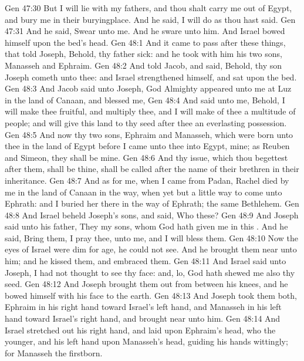 \vs Gen 47:30 But I will lie with my fathers, and thou shalt carry me out of Egypt, and bury me in their buryingplace. And he said, I will do as thou hast said.
\vs Gen 47:31 And he said, Swear unto me. And he sware unto him. And Israel bowed himself upon the bed's head.
\vs Gen 48:1 And it came to pass after these things, that  told Joseph, Behold, thy father  sick: and he took with him his two sons, Manasseh and Ephraim.
\vs Gen 48:2 And  told Jacob, and said, Behold, thy son Joseph cometh unto thee: and Israel strengthened himself, and sat upon the bed.
\vs Gen 48:3 And Jacob said unto Joseph, God Almighty appeared unto me at Luz in the land of Canaan, and blessed me,
\vs Gen 48:4 And said unto me, Behold, I will make thee fruitful, and multiply thee, and I will make of thee a multitude of people; and will give this land to thy seed after thee  an everlasting possession.
\vs Gen 48:5 And now thy two sons, Ephraim and Manasseh, which were born unto thee in the land of Egypt before I came unto thee into Egypt,  mine; as Reuben and Simeon, they shall be mine.
\vs Gen 48:6 And thy issue, which thou begettest after them, shall be thine,  shall be called after the name of their brethren in their inheritance.
\vs Gen 48:7 And as for me, when I came from Padan, Rachel died by me in the land of Canaan in the way, when yet  but a little way to come unto Ephrath: and I buried her there in the way of Ephrath; the same  Bethlehem.
\vs Gen 48:8 And Israel beheld Joseph's sons, and said, Who  these?
\vs Gen 48:9 And Joseph said unto his father, They  my sons, whom God hath given me in this . And he said, Bring them, I pray thee, unto me, and I will bless them.
\vs Gen 48:10 Now the eyes of Israel were dim for age,  he could not see. And he brought them near unto him; and he kissed them, and embraced them.
\vs Gen 48:11 And Israel said unto Joseph, I had not thought to see thy face: and, lo, God hath shewed me also thy seed.
\vs Gen 48:12 And Joseph brought them out from between his knees, and he bowed himself with his face to the earth.
\vs Gen 48:13 And Joseph took them both, Ephraim in his right hand toward Israel's left hand, and Manasseh in his left hand toward Israel's right hand, and brought  near unto him.
\vs Gen 48:14 And Israel stretched out his right hand, and laid  upon Ephraim's head, who  the younger, and his left hand upon Manasseh's head, guiding his hands wittingly; for Manasseh  the firstborn.
